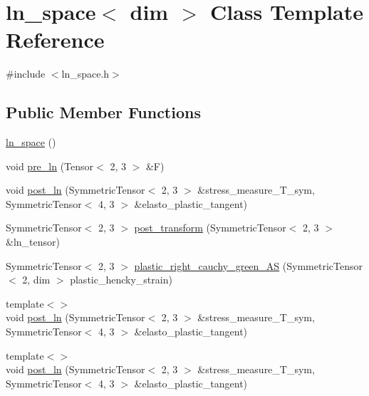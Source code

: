 \hypertarget{classln__space}{}\section{ln\+\_\+space$<$ dim $>$ Class Template Reference}
\label{classln__space}


{\ttfamily \#include $<$ln\+\_\+space.\+h$>$}

\subsection*{Public Member Functions}
\begin{DoxyCompactItemize}
\item 
\hyperlink{classln__space_a5d3087877e476279df3ccab704566655}{ln\+\_\+space} ()
\item 
void \hyperlink{classln__space_afd73aff0a5edd4cf90ea052f2cba890a}{pre\+\_\+ln} (Tensor$<$ 2, 3 $>$ \&F)
\item 
void \hyperlink{classln__space_a4a0d3652278941a33eb8faabac18656b}{post\+\_\+ln} (Symmetric\+Tensor$<$ 2, 3 $>$ \&stress\+\_\+measure\+\_\+\+T\+\_\+sym, Symmetric\+Tensor$<$ 4, 3 $>$ \&elasto\+\_\+plastic\+\_\+tangent)
\item 
Symmetric\+Tensor$<$ 2, 3 $>$ \hyperlink{classln__space_a279e6632ebc6d2887f9430d18446aafd}{post\+\_\+transform} (Symmetric\+Tensor$<$ 2, 3 $>$ \&ln\+\_\+tensor)
\item 
Symmetric\+Tensor$<$ 2, 3 $>$ \hyperlink{classln__space_afb4fe2ff7cd10ebe984bd202c432333f}{plastic\+\_\+right\+\_\+cauchy\+\_\+green\+\_\+\+AS} (Symmetric\+Tensor$<$ 2, dim $>$ plastic\+\_\+hencky\+\_\+strain)
\item 
{\footnotesize template$<$$>$ }\\void \hyperlink{classln__space_ac970f109530044b1b7e7b44b972e4b83}{post\+\_\+ln} (Symmetric\+Tensor$<$ 2, 3 $>$ \&stress\+\_\+measure\+\_\+\+T\+\_\+sym, Symmetric\+Tensor$<$ 4, 3 $>$ \&elasto\+\_\+plastic\+\_\+tangent)
\item 
{\footnotesize template$<$$>$ }\\void \hyperlink{classln__space_abb596781de28a26d7f843d5974f8e773}{post\+\_\+ln} (Symmetric\+Tensor$<$ 2, 3 $>$ \&stress\+\_\+measure\+\_\+\+T\+\_\+sym, Symmetric\+Tensor$<$ 4, 3 $>$ \&elasto\+\_\+plastic\+\_\+tangent)
\end{DoxyCompactItemize}
